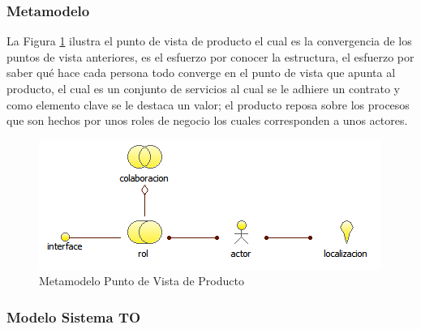       \subsubsection{Metamodelo}
      La Figura \ref{metamodelo6} ilustra el punto de vista de producto el cual es la convergencia de los puntos de vista anteriores, es el esfuerzo por conocer la estructura, el esfuerzo por saber qué hace cada persona todo converge en el punto de vista que apunta al producto, el cual es un conjunto de servicios al cual se le adhiere un contrato y como elemento clave se le destaca un valor; el producto reposa sobre los procesos que son hechos por unos roles de negocio los cuales corresponden a unos actores. \cite{ref9}
      \begin{figure}[h]
        \centering
        \includegraphics{Imagenes/Metamodelos/01}
        \caption{Metamodelo Punto de Vista de Producto \cite{ref9}}
        \label{metamodelo6}
      \end{figure}
      \subsubsection{Modelo Sistema TO}

